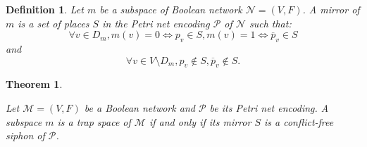 \documentclass[preprint,12pt]{elsarticle}
\newtheorem{theorem}{Theorem}[section]
\newtheorem{definition}{Definition}[section]
\begin{document}
\begin{definition}

  Let \(m\) be a subspace of Boolean network \(\mathcal{N} = (V, F)\). 
  A \emph{mirror} of \(m\) is a set of places \(S\) in the Petri net encoding \(\mathcal{P}\) of \(\mathcal{N}\) such that:
  \[\forall v \in D_m, m(v) = 0 \Leftrightarrow p_v \in S, m(v) = 1 \Leftrightarrow \overline{p}_v \in S\] and \[\forall v \in V \setminus D_m, p_v \not \in S, \overline{p}_v \not \in S.\]

\end{definition}

\begin{theorem}%
\label{theo:ts_2_sp}

  Let \(\mathcal{M} = (V, F)\) be a Boolean network and \(\mathcal{P}\) be its Petri net encoding. A subspace \(m\) is a trap space of \(\mathcal{M}\) if and only if its mirror \(S\) is a conflict-free siphon of \(\mathcal{P}\).

\end{theorem}
\end{document}
